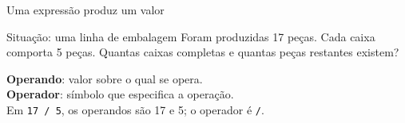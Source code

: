 \begin{frame}{Uma expressão produz um valor}
\begin{block}{Situação: uma linha de embalagem}
Foram produzidas 17 peças. Cada caixa comporta 5 peças. Quantas caixas completas e quantas peças restantes existem?
\end{block}
\begin{center}
\end{center}
\textbf{Operando}: valor sobre o qual se opera.\\
\textbf{Operador}: símbolo que especifica a operação.\\
Em \texttt{17 / 5}, os operandos são 17 e 5; o operador é \texttt{/}.
\end{frame}
